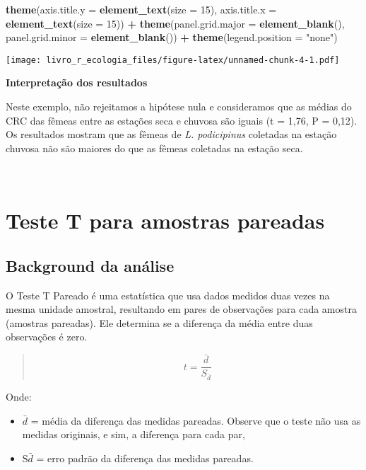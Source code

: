 \documentclass[
]{book}
\newenvironment{Shaded}{\begin{snugshade}}{\end{snugshade}}
\newcommand{\DataTypeTok}[1]{\textcolor[rgb]{0.13,0.29,0.53}{#1}}
\newcommand{\DecValTok}[1]{\textcolor[rgb]{0.00,0.00,0.81}{#1}}
\newcommand{\KeywordTok}[1]{\textcolor[rgb]{0.13,0.29,0.53}{\textbf{#1}}}
\newcommand{\NormalTok}[1]{#1}
\newcommand{\OperatorTok}[1]{\textcolor[rgb]{0.81,0.36,0.00}{\textbf{#1}}}
\newcommand{\StringTok}[1]{\textcolor[rgb]{0.31,0.60,0.02}{#1}}
\begin{document}
\begin{Shaded}
\begin{Highlighting}[]
\StringTok{  }\KeywordTok{theme}\NormalTok{(}\DataTypeTok{axis.title.y =} \KeywordTok{element_text}\NormalTok{(}\DataTypeTok{size =} \DecValTok{15}\NormalTok{), }\DataTypeTok{axis.title.x =} \KeywordTok{element_text}\NormalTok{(}\DataTypeTok{size =} \DecValTok{15}\NormalTok{)) }\OperatorTok{+}
\StringTok{  }\KeywordTok{theme}\NormalTok{(}\DataTypeTok{panel.grid.major =} \KeywordTok{element_blank}\NormalTok{(), }\DataTypeTok{panel.grid.minor =} \KeywordTok{element_blank}\NormalTok{()) }\OperatorTok{+}
\StringTok{  }\KeywordTok{theme}\NormalTok{(}\DataTypeTok{legend.position =} \StringTok{"none"}\NormalTok{)}
\end{Highlighting}
\end{Shaded}

\texttt{[image: livro\_r\_ecologia\_files/figure-latex/unnamed-chunk-4-1.pdf]}

\textbf{Interpretação dos resultados}

Neste exemplo, não rejeitamos a hipótese nula e consideramos que as médias do CRC das fêmeas entre as estações seca e chuvosa são iguais (t = 1,76, P = 0,12). Os resultados mostram que as fêmeas de \emph{L. podicipinus} coletadas na estação chuvosa não são maiores do que as fêmeas coletadas na estação seca.

~

\hypertarget{teste-t-para-amostras-pareadas}{%
\section{Teste T para amostras pareadas}\label{teste-t-para-amostras-pareadas}}

\hypertarget{background-da-anuxe1lise-1}{%
\subsection{Background da análise}\label{background-da-anuxe1lise-1}}

O Teste T Pareado é uma estatística que usa dados medidos duas vezes na mesma unidade amostral, resultando em pares de observações para cada amostra (amostras pareadas). Ele determina se a diferença da média entre duas observações é zero.

\begin{quote}
\[ t = \frac{\bar{d}}{S_{\bar{d}}}\]
\end{quote}

Onde:

\begin{itemize}
\item
  \(\bar{d}\) = média da diferença das medidas pareadas. Observe que o teste não usa as medidas originais, e sim, a diferença para cada par,
\item
  S\(\bar{d}\) = erro padrão da diferença das medidas pareadas.
\end{itemize}
\end{document}
